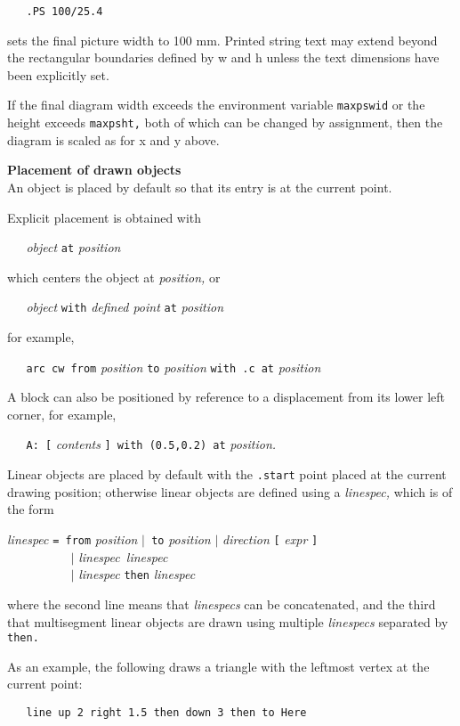 {\tt \ \ \ .PS\ 100/25.4}

sets the final picture width to 100 mm.
Printed string text may extend beyond the rectangular boundaries
defined by w and h unless the text dimensions have been explicitly set.

If the final diagram width exceeds the environment variable
{\tt maxpswid}
or the height exceeds
{\tt maxpsht,}
both of which can be changed by assignment,
then the diagram is scaled as for x and y above.
% 
\par\hskip-2pc{\bf Placement of drawn objects}\\
An object is placed by default so that its entry is at
the current point.

Explicit placement is obtained with

{\it \ \ \ object}
{\tt at}
{\it position}

which centers the object at
{\it position,}
or

{\it \ \ \ object}
{\tt with}
{\it defined point}
{\tt at}
{\it position}

for example,

{\tt \ \ \ arc\ cw\ from}
{\it position}
{\tt to}
{\it position}
{\tt with\ .c\ at}
{\it position}

A block can also be positioned by reference to a displacement from its
lower left corner, for example,

{\tt \ \ \ A:\ [}
{\it contents}
{\tt ]\ with\ (0.5,0.2)\ at}
{\it position.}

Linear objects are placed by default with the
{\tt .start}
point placed at the current drawing
position; otherwise linear objects are defined using a
{\it linespec,}
which is of the form

{\it linespec}
{\tt =\ from}
{\it position}
{\tt $|$\ to}
{\it position}
{\tt $|$}
{\it direction}
{\tt [}
{\it expr}
{\tt ]}
\\\hbox{}\hskip-1pt
{\tt \ \ \ \ \ \ \ \ \ \ $|$}
{\it linespec\ linespec}
\\\hbox{}\hskip-1pt
{\tt \ \ \ \ \ \ \ \ \ \ $|$}
{\it linespec}
{\tt then}
{\it linespec}

where
the second line means that
{\it linespecs}
can be concatenated, and the third
that multisegment linear objects are drawn using multiple
{\it linespecs}
separated by
{\tt then.}

As an example, the following draws a triangle with the leftmost vertex
at the current point:

{\tt \ \ \ line\ up\ 2\ right\ 1.5\ then\ down\ 3\ then\ to\ Here}

